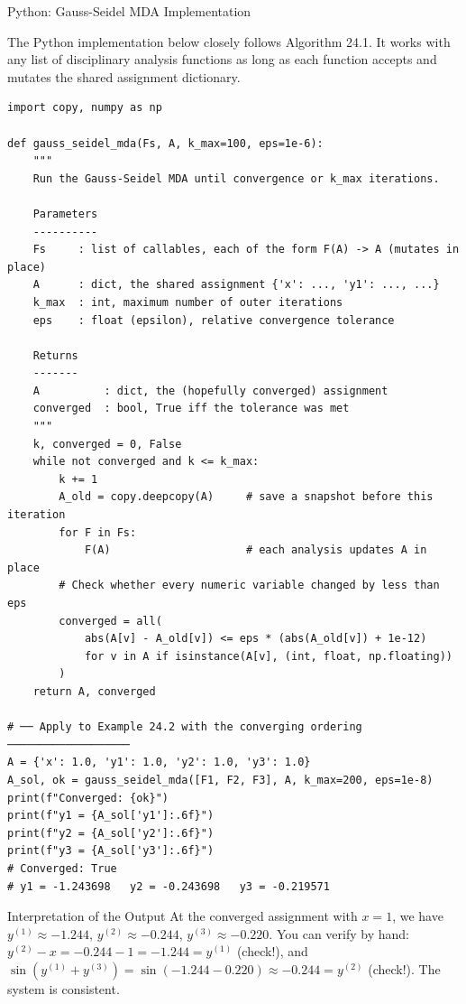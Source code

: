\documentclass[aspectratio=169,10pt]{beamer}
\begin{document}
\begin{frame}[fragile]{Python: Gauss-Seidel MDA Implementation}

  The Python implementation below closely follows Algorithm 24.1.
  It works with any list of disciplinary analysis functions as long as
  each function accepts and mutates the shared assignment dictionary.

  \begin{lstlisting}[style=python]
import copy, numpy as np

def gauss_seidel_mda(Fs, A, k_max=100, eps=1e-6):
    """
    Run the Gauss-Seidel MDA until convergence or k_max iterations.

    Parameters
    ----------
    Fs     : list of callables, each of the form F(A) -> A (mutates in place)
    A      : dict, the shared assignment {'x': ..., 'y1': ..., ...}
    k_max  : int, maximum number of outer iterations
    eps    : float (epsilon), relative convergence tolerance

    Returns
    -------
    A          : dict, the (hopefully converged) assignment
    converged  : bool, True iff the tolerance was met
    """
    k, converged = 0, False
    while not converged and k <= k_max:
        k += 1
        A_old = copy.deepcopy(A)     # save a snapshot before this iteration
        for F in Fs:
            F(A)                     # each analysis updates A in place
        # Check whether every numeric variable changed by less than eps
        converged = all(
            abs(A[v] - A_old[v]) <= eps * (abs(A_old[v]) + 1e-12)
            for v in A if isinstance(A[v], (int, float, np.floating))
        )
    return A, converged

# ── Apply to Example 24.2 with the converging ordering ───────────────────
A = {'x': 1.0, 'y1': 1.0, 'y2': 1.0, 'y3': 1.0}
A_sol, ok = gauss_seidel_mda([F1, F2, F3], A, k_max=200, eps=1e-8)
print(f"Converged: {ok}")
print(f"y1 = {A_sol['y1']:.6f}")
print(f"y2 = {A_sol['y2']:.6f}")
print(f"y3 = {A_sol['y3']:.6f}")
# Converged: True
# y1 = -1.243698   y2 = -0.243698   y3 = -0.219571
  \end{lstlisting}

  \begin{block}{Interpretation of the Output}
    At the converged assignment with $x=1$, we have
    $y^{(1)} \approx -1.244$, $y^{(2)} \approx -0.244$,
    $y^{(3)} \approx -0.220$.  You can verify by hand: $y^{(2)} - x
    = -0.244 - 1 = -1.244 = y^{(1)}$ (check!), and
    $\sin(y^{(1)} + y^{(3)}) = \sin(-1.244 - 0.220) \approx -0.244 = y^{(2)}$
    (check!).  The system is consistent.
  \end{block}

\end{frame}
\end{document}
